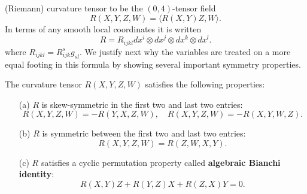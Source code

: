 (Riemann) curvature tensor to be the $(0,4)$-tensor field
\[R(X,Y,Z,W)=\langle R(X,Y)Z,W\rangle.\]
In terms of any smooth local coordinates it is written
\[R=R_{ijkl}dx^i\otimes dx^j\otimes dx^k\otimes dx^l.\]
where $R_{ijkl}=R_{ijk}^sg_{sl}$. We justify next why the variables are treated on a more equal footing in this formula by showing several important symmetry properties.
\begin{proposition}\label{Riemann curvature symmetry}
The curvature tensor $R(X,Y,Z,W)$ satisfies the following properties:
\begin{itemize}
\item[(a)] $R$ is skew-symmetric in the first two and last two entries:
\[R(X,Y,Z,W)=-R(Y,X,Z,W),\quad R(X,Y,Z,W)=-R(X,Y,W,Z).\] 
\item[(b)] $R$ is symmetric between the first two and last two entries:
\[R(X,Y,Z,W)=R(Z,W,X,Y).\] 
\item[(c)] $R$ satisfies a cyclic permutation property called \textbf{algebraic Bianchi identity}:
\[R(X,Y)Z+R(Y,Z)X+R(Z,X)Y=0.\] 
\end{itemize}
\end{proposition}
